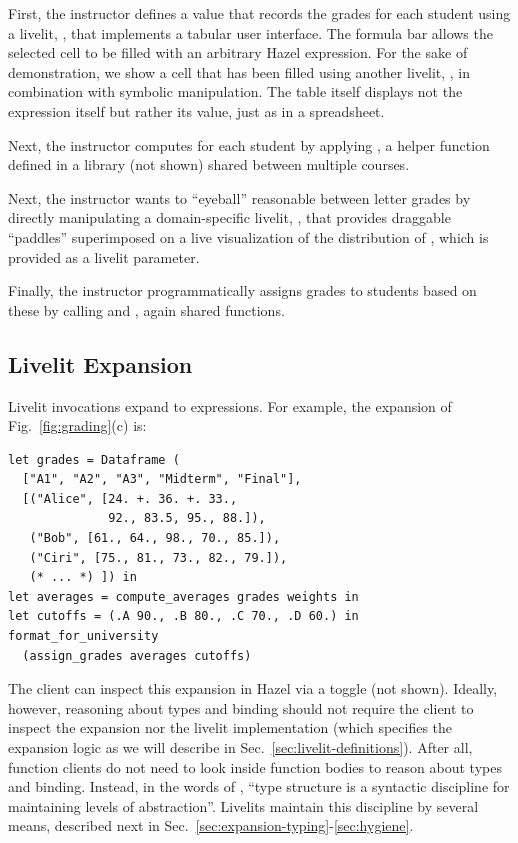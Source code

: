 First, the instructor defines a value  
that records the grades for each student using a livelit, , 
that implements a tabular user interface. The formula bar 
allows the selected cell to be filled with an arbitrary Hazel expression. 
For the sake of demonstration, we show a cell that has been filled using another livelit, 
, in combination with symbolic manipulation.
The table itself displays not the expression itself but rather its value, just as in a spreadsheet.

Next, the instructor computes  
for each student by applying , a helper function 
defined in a library  (not shown) shared between multiple courses.

Next, the instructor wants to ``eyeball'' reasonable  between letter grades 
by directly manipulating a domain-specific livelit, , that provides draggable ``paddles'' 
superimposed on a live visualization of the distribution of , which is provided as a livelit parameter.

Finally, 
the instructor programmatically assigns grades to students 
based on these  
by calling  
and ,
again shared functions.

\subsection{Livelit Expansion}\label{sec:livelit-expansion}
Livelit invocations 
expand to expressions.
For example, the expansion of Fig.~\ref{fig:grading}(c) is:

\begin{lstlisting}[xleftmargin=0.2cm]
let grades = Dataframe (
  ["A1", "A2", "A3", "Midterm", "Final"],
  [("Alice", [24. +. 36. +. 33., 
              92., 83.5, 95., 88.]),
   ("Bob", [61., 64., 98., 70., 85.]),
   ("Ciri", [75., 81., 73., 82., 79.]),
   (* ... *) ]) in
let averages = compute_averages grades weights in
let cutoffs = (.A 90., .B 80., .C 70., .D 60.) in
format_for_university 
  (assign_grades averages cutoffs)
\end{lstlisting}

The client can inspect this expansion in Hazel via a toggle (not shown).
Ideally, however, reasoning about types and binding
should not require the client to inspect the expansion 
nor the livelit implementation (which specifies the expansion logic 
as we will describe in Sec.~\ref{sec:livelit-definitions}).
After all, function clients do not need to look inside
function bodies to reason about types and binding.
Instead, in the words of \citet{DBLP:conf/ifip/Reynolds83},
``type structure is a syntactic discipline for maintaining levels of abstraction''.
Livelits maintain this discipline by
several means, described next in Sec.~\ref{sec:expansion-typing}-\ref{sec:hygiene}.

